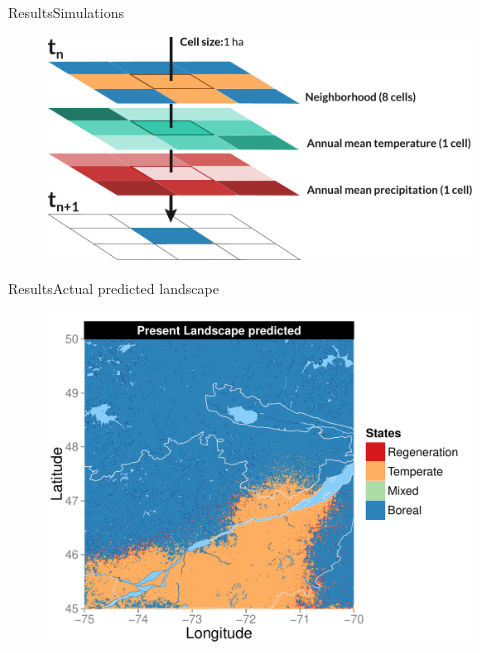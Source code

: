 \documentclass[10pt,aspectratio=149]{beamer}
\begin{document}
\begin{frame}{Results}{Simulations}

		\begin{figure}
			\includegraphics[width=1.2\paperheight]{Figs/explicit.pdf}
		\end{figure}
		
	
\end{frame}


\begin{frame}[t]{Results}{Actual predicted landscape}

		\begin{figure}
			\vspace{-1em}
			\includegraphics[height=0.80\paperheight]{Figs/PresentLand.pdf}
		\end{figure}


\end{frame}
\end{document}
